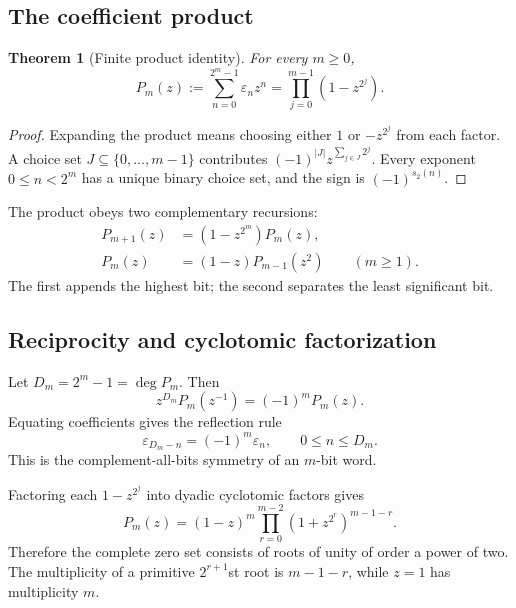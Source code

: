 \documentclass[11pt,oneside]{article}
\newtheorem{theorem}{Theorem}[section]
\theoremstyle{definition}
\theoremstyle{remark}
\newcommand{\bitsum}{s_2}
\newcommand{\eps}{\varepsilon}
\begin{document}
\subsection{The coefficient product}

\begin{theorem}[Finite product identity]\label{p3:thm:finite-product}
For every $m\ge0$,
\begin{equation}\label{p3:eq:finite-product}
 \boxed{\quad
 P_m(z):=\sum_{n=0}^{2^m-1}\eps_nz^n
 =\prod_{j=0}^{m-1}(1-z^{2^j}).
 \quad}
\end{equation}
\end{theorem}

\begin{proof}
Expanding the product means choosing either $1$ or $-z^{2^j}$ from each
factor.  A choice set $J\subseteq\{0,\ldots,m-1\}$ contributes
$(-1)^{|J|}z^{\sum_{j\in J}2^j}$.  Every exponent $0\le n<2^m$ has a unique
binary choice set, and the sign is $(-1)^{\bitsum(n)}$.
\end{proof}

The product obeys two complementary recursions:
\begin{align}
 P_{m+1}(z)&=(1-z^{2^m})P_m(z),\label{p3:eq:P-adjoin}\\
 P_m(z)&=(1-z)P_{m-1}(z^2)\qquad(m\ge1).\label{p3:eq:P-mahler-finite}
\end{align}
The first appends the highest bit; the second separates the least significant
bit.

\subsection{Reciprocity and cyclotomic factorization}

Let $D_m=2^m-1=\deg P_m$.  Then
\begin{equation}\label{p3:eq:P-reciprocity}
 z^{D_m}P_m(z^{-1})=(-1)^mP_m(z).
\end{equation}
Equating coefficients gives the reflection rule
\begin{equation}\label{p3:eq:reflection-rule}
 \eps_{D_m-n}=(-1)^m\eps_n,
 \qquad 0\le n\le D_m.
\end{equation}
This is the complement-all-bits symmetry of an $m$-bit word.

Factoring each $1-z^{2^j}$ into dyadic cyclotomic factors gives
\begin{equation}\label{p3:eq:cyclotomic-factorization}
 P_m(z)=(1-z)^m
 \prod_{r=0}^{m-2}(1+z^{2^r})^{m-1-r}.
\end{equation}
Therefore the complete zero set consists of roots of unity of order a power of
two.  The multiplicity of a primitive $2^{r+1}$st root is $m-1-r$, while
$z=1$ has multiplicity $m$.
\end{document}
